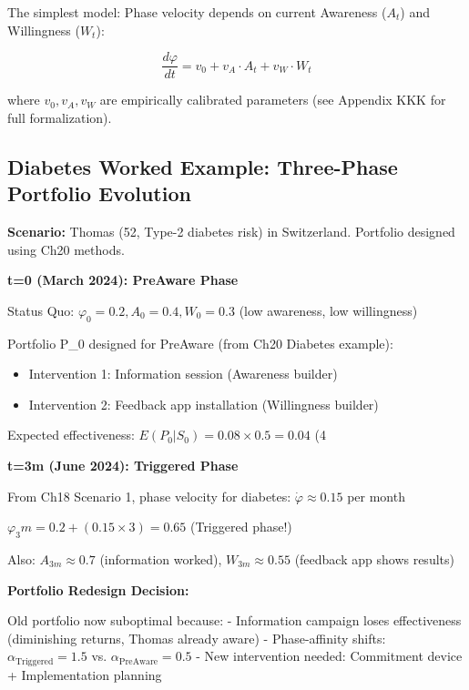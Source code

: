 The simplest model: Phase velocity depends on current Awareness ($A_t$) and Willingness ($W_t$):

\begin{equation}
\frac{d\varphi}{dt} = v_0 + v_A \cdot A_t + v_W \cdot W_t
\label{eq:21-phase-velocity}
\end{equation}

where $v_0, v_A, v_W$ are empirically calibrated parameters (see Appendix KKK for full formalization).

\subsection{Diabetes Worked Example: Three-Phase Portfolio Evolution}

\textbf{Scenario:} Thomas (52, Type-2 diabetes risk) in Switzerland. Portfolio designed using Ch20 methods.

\textbf{t=0 (March 2024): PreAware Phase}

Status Quo: $\varphi_0 = 0.2, A_0 = 0.4, W_0 = 0.3$ (low awareness, low willingness)

Portfolio P_0 designed for PreAware (from Ch20 Diabetes example):
\begin{itemize}[nosep]
\item Intervention 1: Information session (Awareness builder)
\item Intervention 2: Feedback app installation (Willingness builder)
\end{itemize}

Expected effectiveness: $E(P_0 | S_0) = 0.08 \times 0.5 = 0.04$ (4%

\textbf{t=3m (June 2024): Triggered Phase}

From Ch18 Scenario 1, phase velocity for diabetes: $\dot{\varphi} \approx 0.15$ per month

$\varphi_3m = 0.2 + (0.15 \times 3) = 0.65$ (Triggered phase!)

Also: $A_{3m} \approx 0.7$ (information worked), $W_{3m} \approx 0.55$ (feedback app shows results)

\textbf{Portfolio Redesign Decision:}

Old portfolio now suboptimal because:
- Information campaign loses effectiveness (diminishing returns, Thomas already aware)
- Phase-affinity shifts: $\alpha_{\text{Triggered}} = 1.5$ vs. $\alpha_{\text{PreAware}} = 0.5$
- New intervention needed: Commitment device + Implementation planning

